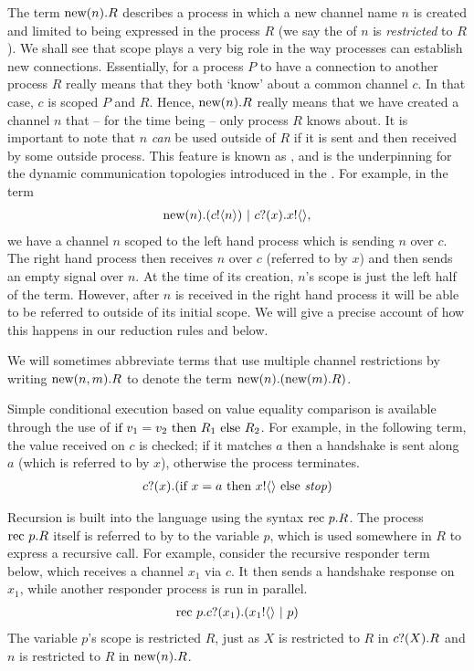 	The term $\text{new}({n}). R$ describes a process in which a new channel name $n$ is created and limited to being expressed in the process $R$ (we say the  of $n$ is \emph{restricted} to $R$).  
We shall see that scope plays a very big role in the way processes can establish new connections.  
Essentially, for a process $P$ to have a connection to another process $R$ really means that they both `know' about a common channel $c$.  
In that case, $c$ is scoped $P$ and $R$.  
Hence, $\text{new}({n}). R$ really means that we have created a channel $n$ that -- for the time being -- only process $R$ knows about.  
It is important to note that $n$ \emph{can} be used outside of $R$ if it is sent and then received by some outside process.  
This feature is known as , and is the underpinning for the dynamic communication topologies introduced in the \picalc.  
For example, in the term
\begin{align}
	\text{new}({n}). ({c}!\langle{n}\rangle) \ |\  {c}?({x}). {x}!\langle{}\rangle,
\end{align}
	we have a channel $n$ scoped to the left hand process which is sending $n$ over $c$. 
	The right hand process then receives $n$ over $c$ (referred to by $x$) and then sends an empty signal over $n$.  
At the time of its creation, $n$'s scope is just the left half of the term.  
However, after $n$ is received in the right hand process it will be able to be referred to outside of its initial scope.  
We will give a precise account of how this happens in our reduction rules and  below.
	
	We will sometimes abbreviate terms that use multiple channel restrictions by writing $\text{new}({n,m}).R$ to denote the term $\text{new}({n}).(\text{new}({m}).R)$. 
	
	Simple conditional execution based on value equality comparison is available through the use of $\text{if } {v_1 = v_2}\text{ then } R_1 \text{ else } R_2$.  
For example, in the following term, the value received on $c$ is checked; if it matches $a$ then a handshake is sent along $a$ (which is referred to by $x$), otherwise the process terminates.
	\begin{align}
		{c}?({x}).(\text{if } {x=a} \text{ then } {x}!\langle{}\rangle \text{ else } \mbox{\emph{stop}})
	\end{align}
	
	Recursion is built into the language using the syntax $\text{rec }{p}.R$.  
The process $\text{rec }{p}.R$ itself is referred to by to the variable $p$, which is used somewhere in $R$ to express a recursive call.  
For example, consider the recursive responder term below, which receives a channel $x_1$ via $c$.  
It then sends a handshake response on $x_1$, while another responder process is run in parallel.
	\begin{align}
		\text{rec }{p}.{c}?({x_1}).({x_1}!\langle{}\rangle \ |\  p)
		\label{reclistenerterm}
	\end{align}
The variable $p$'s scope is restricted $R$, just as $X$ is restricted to $R$ in ${c}?({X}).R$ and $n$ is restricted to $R$ in $\text{new}({n}).R$.
	
